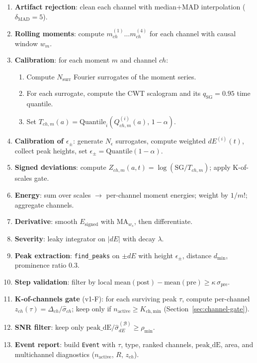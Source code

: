 \documentclass{article}
\begin{document}
\begin{enumerate}
  \item \textbf{Artifact rejection}: clean each channel with median+MAD interpolation ($\delta_{\mathrm{MAD}} = 5$).
  \item \textbf{Rolling moments}: compute $m_{ch}^{(1)}\dots m_{ch}^{(4)}$ for each channel with causal window $w_m$.
  \item \textbf{Calibration}: for each moment $m$ and channel $ch$:
        \begin{enumerate}
          \item Compute $N_{\mathrm{surr}}$ Fourier surrogates of the moment series.
          \item For each surrogate, compute the CWT scalogram and its $q_{\mathrm{SG}} = 0.95$ time quantile.
          \item Set $T_{ch,m}(a) = \mathrm{Quantile}_{i}(Q^{(i)}_{ch,m}(a),\, 1-\alpha)$.
        \end{enumerate}
  \item \textbf{Calibration of $\epsilon_{\pm}$}: generate $N_\epsilon$ surrogates, compute
        weighted $dE^{(i)}(t)$, collect peak heights, set $\epsilon_{\pm} = \mathrm{Quantile}(1-\alpha)$.
  \item \textbf{Signed deviations}: compute $Z_{ch,m}(a,t) = \log(\mathrm{SG}/T_{ch,m})$; apply K-of-scales gate.
  \item \textbf{Energy}: sum over scales $\to$ per-channel moment energies; weight by $1/m!$; aggregate channels.
  \item \textbf{Derivative}: smooth $E_{\mathrm{signed}}$ with $\mathrm{MA}_{w_s}$, then differentiate.
  \item \textbf{Severity}: leaky integrator on $|dE|$ with decay $\lambda$.
  \item \textbf{Peak extraction}: \texttt{find\_peaks} on $\pm dE$ with height $\epsilon_{\pm}$, distance $d_{\min}$, prominence ratio 0.3.
  \item \textbf{Step validation}: filter by local $\mathrm{mean}(\mathrm{post}) - \mathrm{mean}(\mathrm{pre}) \ge \kappa\,\sigma_{\mathrm{pre}}$.
  \item \textbf{K-of-channels gate} (v1-F): for each surviving peak $\tau$, compute per-channel
        $z_{ch}(\tau) = \Delta_{ch}/\hat{\sigma}_{ch}$; keep only if $n_{\mathrm{active}} \ge K_{\mathrm{ch,min}}$
        (Section~\ref{sec:channel-gate}).
  \item \textbf{SNR filter}: keep only $\mathrm{peak\_dE}/\hat{\sigma}_{dE}^{(\mathcal{B})} \ge \rho_{\min}$.
  \item \textbf{Event report}: build \texttt{Event} with $\tau$, type, ranked channels, $\mathrm{peak\_dE}$, area,
        and multichannel diagnostics ($n_{\mathrm{active}}$, $R$, $z_{ch}$).
\end{enumerate}
\end{document}
